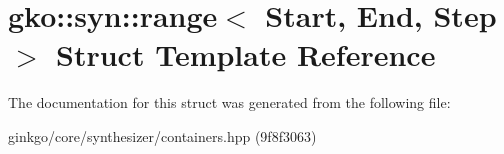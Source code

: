 \hypertarget{structgko_1_1syn_1_1range}{}\section{gko\+:\+:syn\+:\+:range$<$ Start, End, Step $>$ Struct Template Reference}
\label{structgko_1_1syn_1_1range}


The documentation for this struct was generated from the following file\+:\begin{DoxyCompactItemize}
\item 
ginkgo/core/synthesizer/containers.\+hpp (9f8f3063)\end{DoxyCompactItemize}
